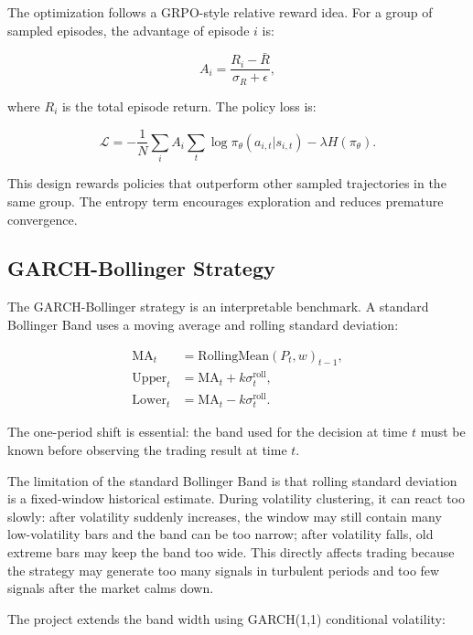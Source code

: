 \documentclass[11pt,a4paper]{article}
\begin{document}
The optimization follows a GRPO-style relative reward idea. For a group of sampled episodes, the advantage of episode $i$ is:

\begin{equation}
    A_i = \frac{R_i - \bar{R}}{\sigma_R + \epsilon},
\end{equation}

where $R_i$ is the total episode return. The policy loss is:

\begin{equation}
    \mathcal{L} = -\frac{1}{N}\sum_i A_i \sum_t \log \pi_\theta(a_{i,t}|s_{i,t}) - \lambda H(\pi_\theta).
\end{equation}

This design rewards policies that outperform other sampled trajectories in the same group. The entropy term encourages exploration and reduces premature convergence.

\subsection{GARCH-Bollinger Strategy}

The GARCH-Bollinger strategy is an interpretable benchmark. A standard Bollinger Band uses a moving average and rolling standard deviation:

\begin{align}
    \mathrm{MA}_t &= \mathrm{RollingMean}(P_t, w)_{t-1},\\
    \mathrm{Upper}_t &= \mathrm{MA}_t + k\sigma^{\mathrm{roll}}_t,\\
    \mathrm{Lower}_t &= \mathrm{MA}_t - k\sigma^{\mathrm{roll}}_t.
\end{align}

The one-period shift is essential: the band used for the decision at time $t$ must be known before observing the trading result at time $t$.

The limitation of the standard Bollinger Band is that rolling standard deviation is a fixed-window historical estimate. During volatility clustering, it can react too slowly: after volatility suddenly increases, the window may still contain many low-volatility bars and the band can be too narrow; after volatility falls, old extreme bars may keep the band too wide. This directly affects trading because the strategy may generate too many signals in turbulent periods and too few signals after the market calms down.

The project extends the band width using GARCH(1,1) conditional volatility:
\end{document}
